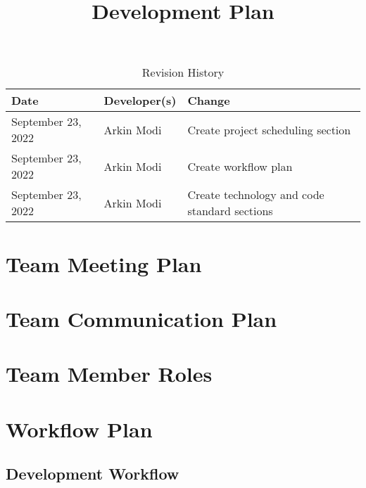 \documentclass{article}
\title{Development Plan\\\progname}
\author{\authname}
\date{}
\begin{document}
\begin{table}[hp]
\caption{Revision History} \label{TblRevisionHistory}
\begin{tabularx}{\textwidth}{llX}
\toprule
\textbf{Date} & \textbf{Developer(s)} & \textbf{Change}\\
\midrule
September 23, 2022 & Arkin Modi & Create project scheduling section\\
September 23, 2022 & Arkin Modi & Create workflow plan\\
September 23, 2022 & Arkin Modi & Create technology and code standard sections\\
\bottomrule
\end{tabularx}
\end{table}

\newpage

\maketitle


\section{Team Meeting Plan}

\section{Team Communication Plan}

\section{Team Member Roles}

\section{Workflow Plan}


\subsection{Development Workflow}
\end{document}
